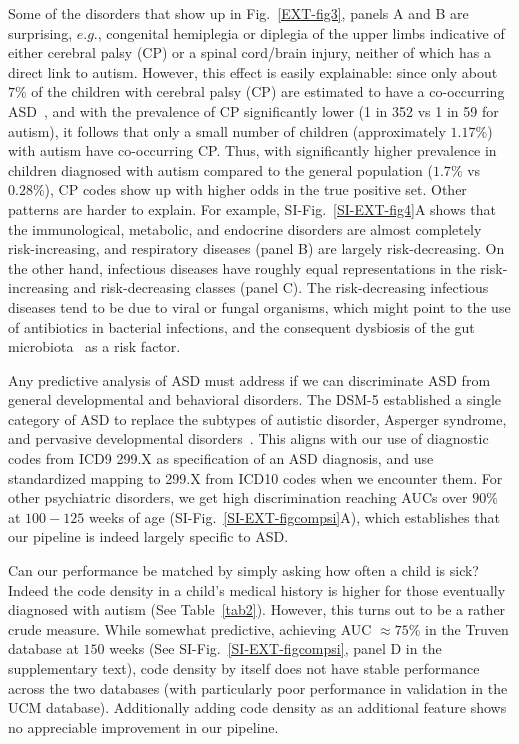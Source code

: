 \documentclass[onecolumn,,10pt]{IEEEtran}
\begin{document}
Some of the disorders that show up in Fig.~\ref{EXT-fig3}, panels A and B are  surprising, $e.g.$,  congenital hemiplegia or diplegia of the upper limbs indicative of either  cerebral palsy (CP) or a spinal cord/brain injury, neither of which has a direct  link to autism. However, this effect is easily explainable: since only about $7\%$ of the children with  cerebral palsy (CP) are estimated to have a  co-occurring ASD~\cite{cdccp,christensen2014prevalence}, and with the prevalence of CP  significantly lower  (1 in 352 vs 1 in 59 for autism), it follows that  only a small number of children (approximately $1.17\%$) with autism have co-occurring CP. Thus, with significantly higher prevalence in children diagnosed with autism compared to the general population ($1.7\%$ vs $0.28\%$), CP codes show  up with higher odds in the true positive set. Other patterns are harder to explain. For example,  SI-Fig.~\ref{SI-EXT-fig4}A shows that the immunological, metabolic, and endocrine disorders are almost completely risk-increasing, and respiratory diseases (panel B) are largely risk-decreasing. On the other hand, infectious diseases have roughly equal representations in the risk-increasing and risk-decreasing classes (panel C). The risk-decreasing infectious diseases tend to be due to viral or fungal organisms, which might point to the use of antibiotics in bacterial infections, and the consequent dysbiosis of the gut microbiota~\cite{pmid30823414,pmid27957319} as a risk factor.

Any predictive analysis of ASD must address if we can
discriminate  ASD from  general developmental and behavioral disorders.
The DSM-5 established a single category of ASD to replace
the subtypes of autistic disorder, Asperger syndrome, and pervasive developmental disorders~\cite{hyman2020identification}. This aligns with our use of diagnostic codes from ICD9 299.X as specification of an ASD diagnosis, and use standardized mapping to 299.X from ICD10 codes when we encounter them. For other psychiatric disorders, we get  high discrimination reaching AUCs over $90\%$ at $100 -125$ weeks of age (SI-Fig.~\ref{SI-EXT-figcompsi}A), which establishes that our pipeline is indeed largely specific to ASD.

Can our performance be matched by simply asking how often a child is sick? Indeed the code density in a child's medical history is higher for those eventually diagnosed with autism (See Table~\ref{tab2}). However, this turns out to be a rather crude measure. While somewhat predictive,  achieving AUC  $\approx 75\%$ in the Truven database at $150$ weeks (See SI-Fig.~\ref{SI-EXT-figcompsi}, panel D in the supplementary text), code density by itself does not have stable  performance across the two databases (with particularly poor performance in validation in the UCM database). Additionally adding code density as an additional  feature shows  no appreciable  improvement in our pipeline.
\end{document}
